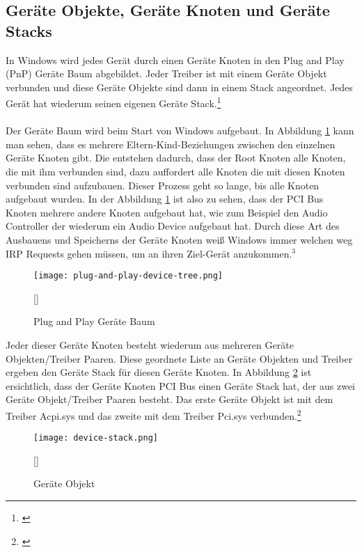 \subsection{Geräte Objekte, Geräte Knoten und Geräte Stacks}
In Windows wird jedes Gerät durch einen Geräte Knoten in den Plug and Play (PnP) Geräte Baum abgebildet. Jeder Treiber ist mit einem Geräte Objekt verbunden und diese Geräte Objekte sind dann in einem Stack angeordnet. Jedes Gerät hat wiederum seinen eigenen Geräte Stack.\footnote[4]{\cite[Vgl.][]{24}}
\\\\
Der Geräte Baum wird beim Start von Windows aufgebaut. In Abbildung \ref{windows-plug-and-play-tree} kann man sehen, dass es mehrere Eltern-Kind-Beziehungen zwischen den einzelnen Geräte Knoten gibt. Die entstehen dadurch, dass der Root Knoten alle Knoten, die mit ihm verbunden sind, dazu auffordert alle Knoten die mit diesen Knoten verbunden sind aufzubauen. Dieser Prozess geht so lange, bis alle Knoten aufgebaut wurden. In der Abbildung \ref{windows-plug-and-play-tree} ist also zu sehen, dass der PCI Bus Knoten mehrere andere Knoten aufgebaut hat, wie zum Beispiel den Audio Controller der wiederum ein Audio Device aufgebaut hat. Durch diese Art des Ausbauens und Speicherns der Geräte Knoten weiß Windows immer welchen weg IRP Requests gehen müssen, um an ihren Ziel-Gerät anzukommen.$^{3}$
\newpage
\begin{figure}[H]
    \centering
    \texttt{[image: plug-and-play-device-tree.png]}
    \caption[Plug and Play Geräte Baum]{Plug and Play Geräte Baum}[\cite{24}]
    \label{windows-plug-and-play-tree} 
\end{figure}
\noindent
Jeder dieser Geräte Knoten besteht wiederum aus mehreren Geräte Objekten/Treiber Paaren. Diese geordnete Liste an Geräte Objekten und Treiber ergeben den Geräte Stack für diesen Geräte Knoten. In Abbildung \ref{windows-device-object} ist ersichtlich, dass der Geräte Knoten PCI Bus einen Geräte Stack hat, der aus zwei Geräte Objekt/Treiber Paaren besteht. Das erste Geräte Objekt ist mit dem Treiber Acpi.sys und das zweite mit dem Treiber Pci.sys verbunden.\footnote[1]{\cite[Vgl.][]{24}}
\begin{figure}[H]
    \centering
    \texttt{[image: device-stack.png]}
    \caption[Geräte Objekt]{Geräte Objekt}[\cite{24}]
    \label{windows-device-object}
\end{figure}
\noindent

\newpage

